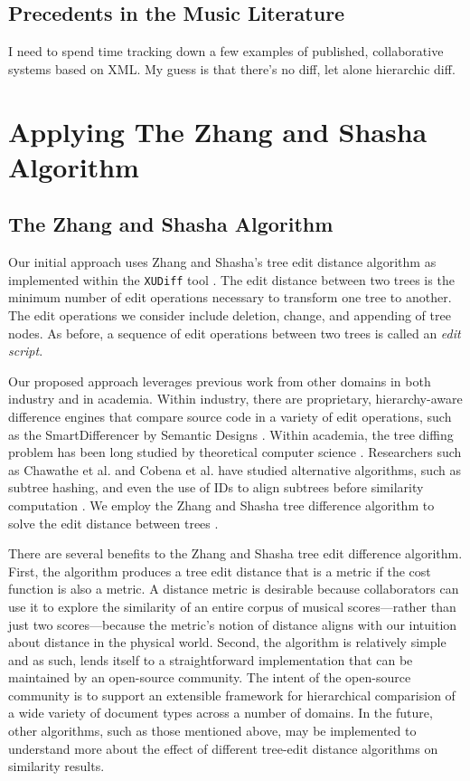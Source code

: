 \documentclass{article}
\begin{document}
\subsection{Precedents in the Music Literature}
I need to spend time tracking down a few examples of published,
collaborative systems based on XML. My guess is that there's no diff,
let alone hierarchic diff.


\section{Applying The Zhang and Shasha Algorithm}
\subsection{The Zhang and Shasha Algorithm}
Our initial approach uses Zhang and Shasha's tree edit distance
algorithm as implemented within the \texttt{XUDiff} tool
\cite{Weaver:2013sl}.  The edit distance between two trees is the
minimum number of edit operations necessary to transform one tree to
another.  The edit operations we consider include deletion, change,
and appending of tree nodes.  As before, a sequence of edit operations
between two trees is called an \emph{edit script}.

Our proposed approach leverages previous work from other domains in both
industry and in academia.  Within industry, there are proprietary,
hierarchy-aware difference engines that compare source code in a variety of 
edit operations, such as the SmartDifferencer by Semantic Designs
\cite{Designs:qm}.  Within academia, the tree diffing problem has been
long studied by theoretical computer science \cite{Bille:2005ec}.
Researchers such as Chawathe et al. and Cobena et
al. have studied alternative algorithms, such as subtree hashing, 
and even the use of IDs to align subtrees before similarity 
computation \cite{Chawathe:1996jb,Cobena:2002gd}.  We employ the Zhang 
and Shasha tree difference algorithm to solve the edit distance between
trees \cite{Zhang:1989ec,Zhang:1989il}.

There are several benefits to the Zhang and Shasha tree edit
difference algorithm.  First, the algorithm produces a tree edit
distance that is a metric if the cost function is also a metric.  A
distance metric is desirable because collaborators can use it to
explore the similarity of an entire corpus of musical scores---rather
than just two scores---because the metric's notion of distance aligns
with our intuition about distance in the physical world.  Second, the
algorithm is relatively simple and as such, lends itself to a
straightforward implementation that can be maintained by an
open-source community.  The intent of the open-source community is to
support an extensible framework for hierarchical comparision of a wide
variety of document types across a number of domains.  In the future,
other algorithms, such as those mentioned above, may be implemented to
understand more about the effect of different tree-edit distance
algorithms on similarity results.
\end{document}

